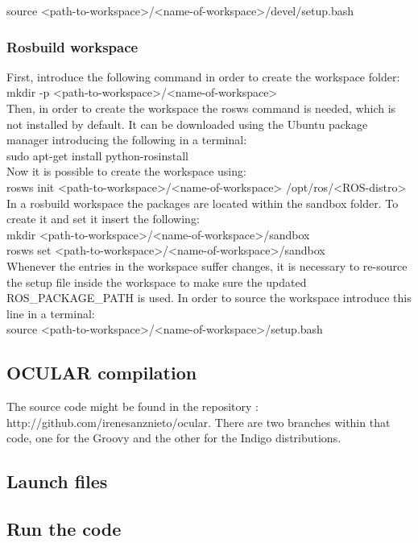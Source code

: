 source <path-to-workspace>/<name-of-workspace>/devel/setup.bash\\




\subsubsection{Rosbuild workspace}
First, introduce the following command in order to create the workspace folder: \\

mkdir -p <path-to-workspace>/<name-of-workspace> \\

Then, in order to create the workspace the rosws command is needed, which is not installed by default. It can be downloaded using the Ubuntu package manager introducing the following in a terminal: \\

sudo apt-get install python-rosinstall\\

Now it is possible to create the workspace using: \\

rosws init <path-to-workspace>/<name-of-workspace> /opt/ros/<ROS-distro>\\

In a rosbuild workspace the packages are located within the sandbox folder. To create it and set it insert the following: \\

mkdir <path-to-workspace>/<name-of-workspace>/sandbox\\

rosws set  <path-to-workspace>/<name-of-workspace>/sandbox\\

Whenever the entries in the workspace suffer changes, it is necessary to re-source the setup file inside the workspace to make sure the updated ROS\_PACKAGE\_PATH is used. In order to source the workspace introduce this line in a terminal: \\

source <path-to-workspace>/<name-of-workspace>/setup.bash\\




\subsection{OCULAR compilation}
The source code might be found in the repository : http://github.com/irenesanznieto/ocular. There are two branches within that code, one for the Groovy and the other for the Indigo distributions. 
\\




\subsection{Launch files}

\subsection{Run the code}
